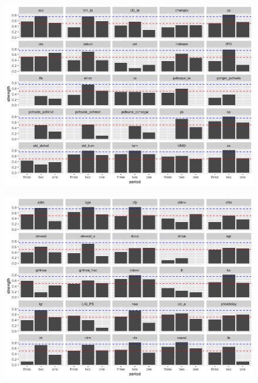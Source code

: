 \begin{landscape}
	\begin{figure}[ht]
		\includegraphics[scale = 0.75]{thirty_decompose_II}
		\centering
	\end{figure}
\end{landscape}

\begin{landscape}
	\begin{figure}[ht]
		\includegraphics[scale = 0.75]{thirty_decompose_III}
		\centering
	\end{figure}
\end{landscape}

